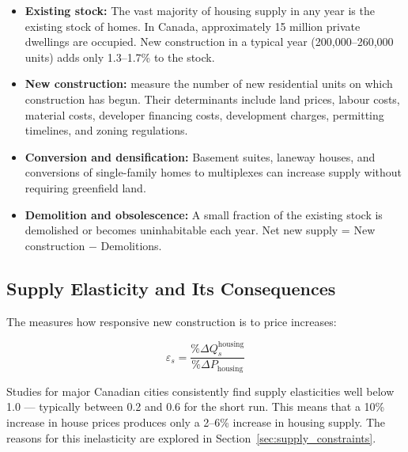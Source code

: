 \begin{itemize}
  \item \textbf{Existing stock:} The vast majority of housing supply in
        any year is the existing stock of homes. In Canada, approximately
        15 million private dwellings are occupied. New construction in a
        typical year (200{,}000--260{,}000 units) adds only 1.3--1.7\%
        to the stock.

  \item \textbf{New construction:}  measure the number
        of new residential units on which construction has begun. Their
        determinants include land prices, labour costs, material costs,
        developer financing costs, development charges, permitting timelines,
        and zoning regulations.

  \item \textbf{Conversion and densification:} Basement suites, laneway
        houses, and conversions of single-family homes to multiplexes
        can increase supply without requiring greenfield land.

  \item \textbf{Demolition and obsolescence:} A small fraction of the
        existing stock is demolished or becomes uninhabitable each year.
        Net new supply = New construction $-$ Demolitions.
\end{itemize}

\subsection{Supply Elasticity and Its Consequences}

The  measures how responsive new construction
is to price increases:

\begin{equation}
  \varepsilon_s = \frac{\%\Delta Q_s^{\text{housing}}}{\%\Delta P_{\text{housing}}}
  \label{eq:supply_elasticity}
\end{equation}

Studies for major Canadian cities consistently find supply elasticities
well below 1.0 --- typically between 0.2 and 0.6 for the short run.
This means that a 10\% increase in house prices produces only a 2--6\%
increase in housing supply. The reasons for this inelasticity are explored
in Section~\ref{sec:supply_constraints}.

